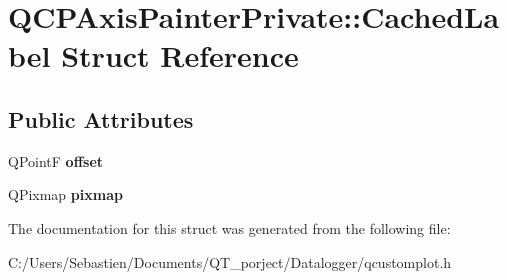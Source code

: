 \hypertarget{struct_q_c_p_axis_painter_private_1_1_cached_label}{}\section{Q\+C\+P\+Axis\+Painter\+Private\+:\+:Cached\+Label Struct Reference}
\label{struct_q_c_p_axis_painter_private_1_1_cached_label}
\subsection*{Public Attributes}
\begin{DoxyCompactItemize}
\item 
\mbox{\label{struct_q_c_p_axis_painter_private_1_1_cached_label_a5f502db71c92e572f1e6f44f62c59d8e}} 
Q\+PointF {\bfseries offset}
\item 
\mbox{\label{struct_q_c_p_axis_painter_private_1_1_cached_label_a461597cbd470914a9d24b64d16037a88}} 
Q\+Pixmap {\bfseries pixmap}
\end{DoxyCompactItemize}


The documentation for this struct was generated from the following file\+:\begin{DoxyCompactItemize}
\item 
C\+:/\+Users/\+Sebastien/\+Documents/\+Q\+T\+\_\+porject/\+Datalogger/qcustomplot.\+h\end{DoxyCompactItemize}

